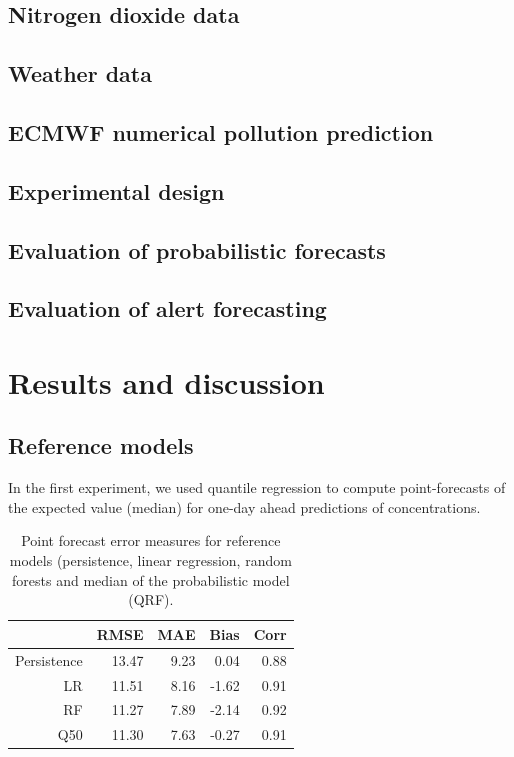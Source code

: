 \documentclass[a4paper,twocolumn,5p]{elsarticle}
\begin{document}
\subsection{Nitrogen dioxide data}
\label{sec:no2}


\subsection{Weather data}
\label{sec:weather-data}

\subsection{ECMWF numerical pollution prediction}
\label{sec:ecmwf-numer-poll}


\subsection{Experimental design}
\label{sec:experimental-design}

\subsection{Evaluation of probabilistic forecasts}
\label{sec:eval-prob-forec}


\subsection{Evaluation of alert forecasting}
\label{sec:eval-extr-value}


\section{Results and discussion}
\label{sec:results}


\subsection{Reference models}
\label{sec:deterministic}

In the first experiment, we used quantile regression to compute
point-forecasts of the expected value (median) for one-day ahead
predictions of \no concentrations.

\begin{table}[tbp]
\caption{\label{tab:determ}Point forecast error measures for reference
models (persistence, linear regression, random forests and median of
the probabilistic model (QRF).}
  \centering
\begin{tabular}{rrrrr}
  \toprule
 & RMSE & MAE & Bias & Corr \\ 
  \midrule
  Persistence & 13.47 & 9.23 & 0.04 & 0.88 \\ 
  LR   & 11.51 & 8.16 & -1.62 & 0.91 \\ 
  RF   & 11.27 & 7.89 & -2.14 & 0.92 \\
  Q50  & 11.30 & 7.63 & -0.27 & 0.91 \\ 
   \bottomrule
\end{tabular}
\end{table}
\end{document}

